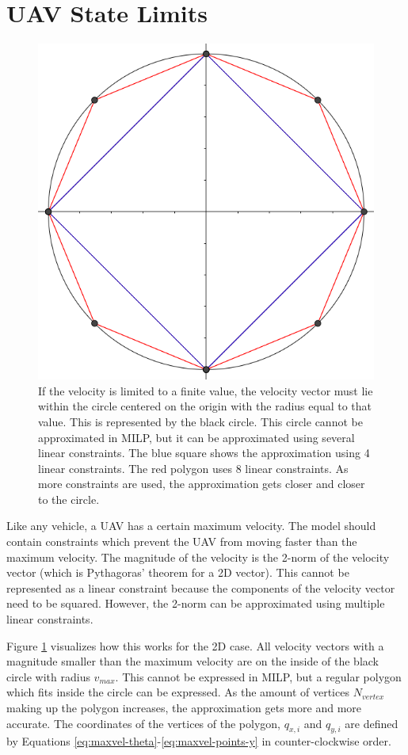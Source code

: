 \section{UAV State Limits}
\label{subsec:state-limits}
\begin{figure}
    \centering
        \includegraphics[width=0.4\columnwidth]{img/circlelinear}
    \caption[A visualization of the linear approximation for the 2-norm]{If the velocity is limited to a finite value, the velocity vector must lie within the circle centered on the origin with the radius equal to that value. This is represented by the black circle. This circle cannot be approximated in MILP, but it can be approximated using several linear constraints. The blue square shows the approximation using 4 linear constraints. The red polygon uses 8 linear constraints. As more constraints are used, the approximation gets closer and closer to the circle. }\label{fig:circlelinear}
\end{figure}
Like any vehicle, a UAV has a certain maximum velocity. The model should contain constraints which prevent the UAV from moving faster than the maximum velocity. The magnitude of the velocity is the 2-norm of the velocity vector (which is Pythagoras' theorem for a 2D vector). This cannot be represented as a linear constraint because the components of the velocity vector need to be squared. However, the 2-norm can be approximated using multiple linear constraints. 
\par
Figure \ref{fig:circlelinear} visualizes how this works for the 2D case. All velocity vectors with a magnitude smaller than the maximum velocity are on the inside of the black circle with radius $v_{max}$. This cannot be expressed in MILP, but a regular polygon which fits inside the circle can be expressed. As the amount of vertices $N_{vertex}$ making up the polygon increases, the approximation gets more and more accurate. The coordinates of the vertices of the polygon, $q_{x,i}$ and $q_{y,i}$ are defined by Equations \ref{eq:maxvel-theta}-\ref{eq:maxvel-points-y} in counter-clockwise order.

